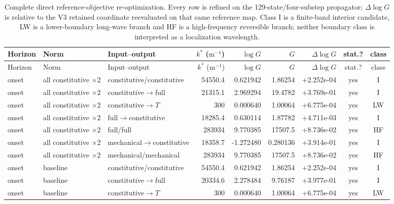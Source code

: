 \begin{landscape}
\begingroup\scriptsize
\setlength{\LTleft}{0pt}\setlength{\LTright}{0pt}\setlength{\tabcolsep}{2pt}
\renewcommand{\arraystretch}{0.95}
\begin{longtable}{@{}p{1.15cm}p{2.55cm}p{3.60cm}rrrrcc@{}}
\caption{Complete direct reference-objective re-optimization.  Every row is refined on the 129-state/four-substep propagator; $\Delta\log G$ is relative to the V3 retained coordinate reevaluated on that same reference map.  Class I is a finite-band interior candidate, LW is a lower-boundary long-wave branch and HF is a high-frequency reversible branch; neither boundary class is interpreted as a localization wavelength.}\label{tab:s_reference_reoptimization}\\
\toprule
Horizon & Norm & Input--output & $k^*$ ($\mathrm{m^{-1}}$) & $\log G$ & $G$ & $\Delta\log G$ & stat.? & class \\
\midrule
\endfirsthead
\toprule
Horizon & Norm & Input--output & $k^*$ ($\mathrm{m^{-1}}$) & $\log G$ & $G$ & $\Delta\log G$ & stat.? & class \\
\midrule
\endhead
onset & all constitutive $\times2$ & constitutive/constitutive & 54550.4 & 0.621942 & 1.86254 & +2.252e-04 & yes & I \\
onset & all constitutive $\times2$ & constitutive$\rightarrow$full & 21315.1 & 2.969294 & 19.4782 & +3.769e-01 & yes & I \\
onset & all constitutive $\times2$ & constitutive$\rightarrow T$ & 300 & 0.000640 & 1.00064 & +6.775e-04 & yes & LW \\
onset & all constitutive $\times2$ & full$\rightarrow$constitutive & 18285.4 & 0.630114 & 1.87782 & +4.711e-03 & yes & I \\
onset & all constitutive $\times2$ & full/full & 283934 & 9.770385 & 17507.5 & +8.736e-02 & yes & HF \\
onset & all constitutive $\times2$ & mechanical$\rightarrow$constitutive & 18358.7 & -1.272480 & 0.280136 & +3.914e-01 & yes & I \\
onset & all constitutive $\times2$ & mechanical/mechanical & 283934 & 9.770385 & 17507.5 & +8.736e-02 & yes & HF \\
onset & baseline & constitutive/constitutive & 54550.4 & 0.621942 & 1.86254 & +2.252e-04 & yes & I \\
onset & baseline & constitutive$\rightarrow$full & 20334.6 & 2.278484 & 9.76187 & +3.977e-01 & yes & I \\
onset & baseline & constitutive$\rightarrow T$ & 300 & 0.000640 & 1.00064 & +6.775e-04 & yes & LW \\

\end{longtable}
\end{landscape}
